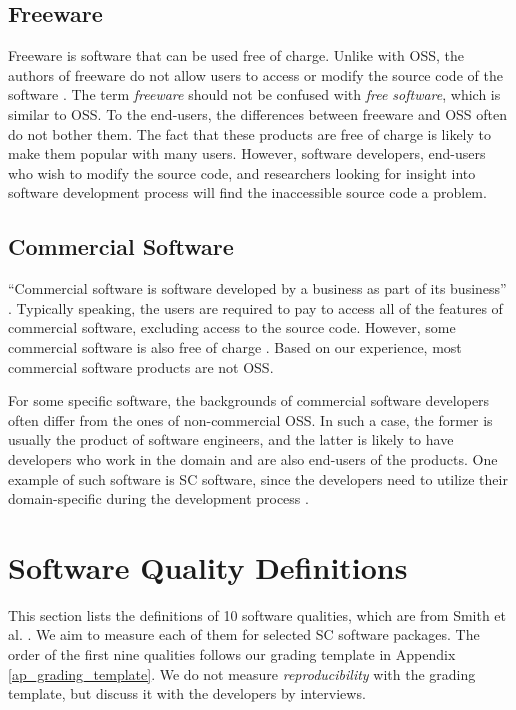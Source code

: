 \subsection{Freeware}
\label{sec_freeware}
Freeware is software that can be used free of charge. Unlike with OSS, the authors of freeware do not allow users to access or modify the source code of the software \cite{LINFO2006}. The term \textit{freeware} should not be confused with \textit{free software}, which is similar to OSS. To the end-users, the differences between freeware and OSS often do not bother them. The fact that these products are free of charge is likely to make them popular with many users. However, software developers, end-users who wish to modify the source code, and researchers looking for insight into software development process will find the inaccessible source code a problem. 

\subsection{Commercial Software}
``Commercial software is software developed by a business as part of its business'' \cite{GNU2019}.
Typically speaking, the users are required to pay to access all of the features of commercial software, excluding access to the source code. However, some commercial software is also free of charge \cite{GNU2019}. Based on our experience, most commercial software products are not OSS.

For some specific software, the backgrounds of commercial software developers often differ from the ones of non-commercial OSS. In such a case, the former is usually the product of software engineers, and the latter is likely to have developers who work in the domain and are also end-users of the products. One example of such software is SC software, since the developers need to utilize their domain-specific during the development process \cite{Wilson2014}.

\section{Software Quality Definitions}
\label{sec_software_quality}

This section lists the definitions of 10 software qualities, which are from Smith et al. \cite{SmithEtAl2020}. We aim to measure each of them for selected SC software packages. The order of the first nine qualities follows our grading template in Appendix \ref{ap_grading_template}. We do not measure \textit{reproducibility} with the grading template, but discuss it with the developers by interviews.


